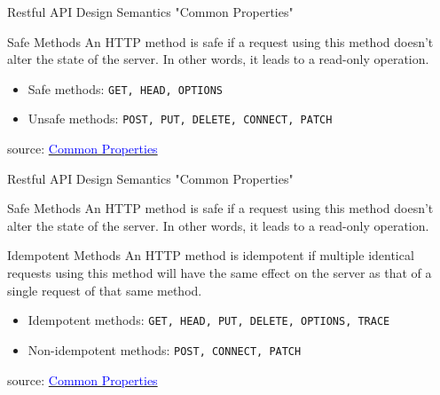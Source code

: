 \documentclass{beamer}
\newcommand{\code}[1]{\colorbox{codegray}{\texttt{#1}}}
\begin{document}
\begin{frame}[t]{Restful API Design Semantics "Common Properties"}
	\scriptsize
	\begin{block}{Safe Methods}
		An HTTP method is safe if a request using this method doesn’t alter the state of the server. In other words, it leads to a read-only operation.\\
		\begin{itemize}
			\item Safe methods: \code{GET, HEAD, OPTIONS}
			\item Unsafe methods: \code{POST, PUT, DELETE, CONNECT, PATCH}
		\end{itemize}				
	\end{block}
	
	\vspace{44mm}
	\tiny source: \href{https://learning.mlytics.com/the-internet/http-request-methods} {\textcolor{blue}{Common Properties}} 
\end{frame}

\begin{frame}[t]{Restful API Design Semantics "Common Properties"}
	\scriptsize
	\begin{block}{Safe Methods}	
		An HTTP method is safe if a request using this method doesn’t alter the state of the server. In other words, it leads to a read-only operation.
	\end{block}
		
	\begin{block}{Idempotent Methods}
		An HTTP method is idempotent if multiple identical requests using this method will have the same effect on the server as that of a single request of that same method.\\
		\begin{itemize}
			\item Idempotent methods: \code{GET, HEAD, PUT, DELETE, OPTIONS, TRACE}
			\item Non-idempotent methods: \code{POST, CONNECT, PATCH}
		\end{itemize}	
	\end{block}
	
	\vspace{27mm}
	\tiny source: \href{https://learning.mlytics.com/the-internet/http-request-methods} {\textcolor{blue}{Common Properties}} 
\end{frame}
\end{document}
